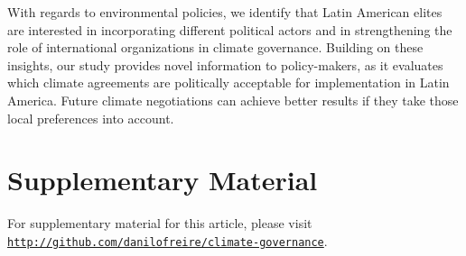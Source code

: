 \documentclass[a4paper,12pt]{article}
\begin{document}
With regards to environmental policies, we identify that Latin American elites are interested in incorporating different political actors and in strengthening the role of international organizations in climate governance. Building on these insights, our study provides novel information to policy-makers, as it evaluates which climate agreements are politically acceptable for implementation in Latin America. Future climate negotiations can achieve better results if they take those local preferences into account.

\section*{Supplementary Material}
\label{sec:supplementary}

For supplementary material for this article, please visit \href{http://github.com/danilofreire/climate-governance}{\texttt{http://github.com/danilofreire/climate-governance}}.



\end{document}
